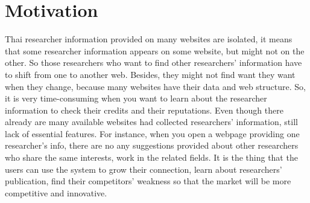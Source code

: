 \section{Motivation}
\label{sec:motivation}

Thai researcher information provided on many websites are isolated, it means that some researcher information appears on some website, but might not on the other. So those researchers who want to find other researchers' information have to shift from one to another web. Besides, they might not find want they want when they change, because many websites have their data and web structure. So, it is very time-consuming when you want to learn about the researcher information to check their credits and their reputations. Even though there already are many available websites had collected researchers' information, still lack of essential features. For instance, when you open a webpage providing one researcher's info, there are no any suggestions provided about other researchers who share the same interests, work in the related fields. It is the thing that the users can use the system to grow their connection, learn about researchers' publication, find their competitors' weakness so that the market will be more competitive and innovative.

